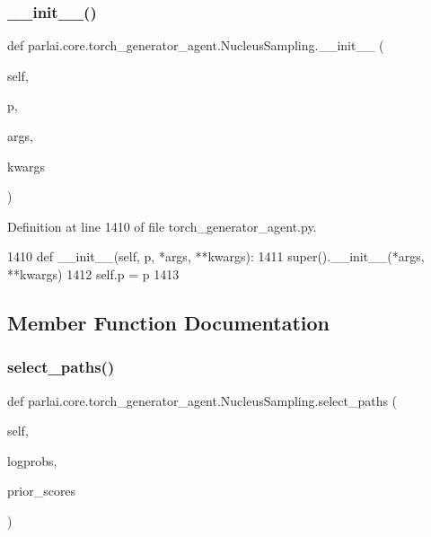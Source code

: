 \subsubsection{\texorpdfstring{\+\_\+\+\_\+init\+\_\+\+\_\+()}{\_\_init\_\_()}}
{\footnotesize\ttfamily def parlai.\+core.\+torch\+\_\+generator\+\_\+agent.\+Nucleus\+Sampling.\+\_\+\+\_\+init\+\_\+\+\_\+ (\begin{DoxyParamCaption}\item[{}]{self,  }\item[{}]{p,  }\item[{}]{args,  }\item[{}]{kwargs }\end{DoxyParamCaption})}



Definition at line 1410 of file torch\+\_\+generator\+\_\+agent.\+py.


\begin{DoxyCode}
1410     \textcolor{keyword}{def }\_\_init\_\_(self, p, *args, **kwargs):
1411         super().\_\_init\_\_(*args, **kwargs)
1412         self.p = p
1413 
\end{DoxyCode}


\subsection{Member Function Documentation}
\mbox{\label{classparlai_1_1core_1_1torch__generator__agent_1_1NucleusSampling_a91abde2fb2dccf5cd0564825ddc5ea4d}} 
\subsubsection{\texorpdfstring{select\+\_\+paths()}{select\_paths()}}
{\footnotesize\ttfamily def parlai.\+core.\+torch\+\_\+generator\+\_\+agent.\+Nucleus\+Sampling.\+select\+\_\+paths (\begin{DoxyParamCaption}\item[{}]{self,  }\item[{}]{logprobs,  }\item[{}]{prior\+\_\+scores }\end{DoxyParamCaption})}



